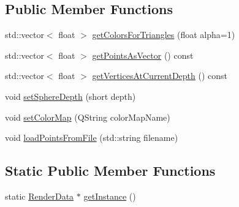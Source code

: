 \subsection*{Public Member Functions}
\begin{DoxyCompactItemize}
\item 
std\+::vector$<$ float $>$ \hyperlink{class_render_data_a58fe3351334cd518b930dfe0a0aa8732}{get\+Colors\+For\+Triangles} (float alpha=1)
\item 
std\+::vector$<$ float $>$ \hyperlink{class_render_data_a24e60dcccd94c47c02e0e47f2ca7b5c2}{get\+Points\+As\+Vector} () const
\item 
std\+::vector$<$ float $>$ \hyperlink{class_render_data_a2aff56e1742b853bcae6f251e258085e}{get\+Vertices\+At\+Current\+Depth} () const
\item 
void \hyperlink{class_render_data_a8d5f7285d29dc9ca0f93fcf2b5826283}{set\+Sphere\+Depth} (short depth)
\item 
void \hyperlink{class_render_data_adb1961bf93370d67c9efb416fde8fefb}{set\+Color\+Map} (Q\+String color\+Map\+Name)
\item 
void \hyperlink{class_render_data_ac161f29f7d6ae6fd3912e8af7bdccdfd}{load\+Points\+From\+File} (std\+::string filename)
\end{DoxyCompactItemize}
\subsection*{Static Public Member Functions}
\begin{DoxyCompactItemize}
\item 
static \hyperlink{class_render_data}{Render\+Data} $\ast$ \hyperlink{class_render_data_a1fffc72f3dd17ab052d4fb2f025ef5a0}{get\+Instance} ()
\end{DoxyCompactItemize}
